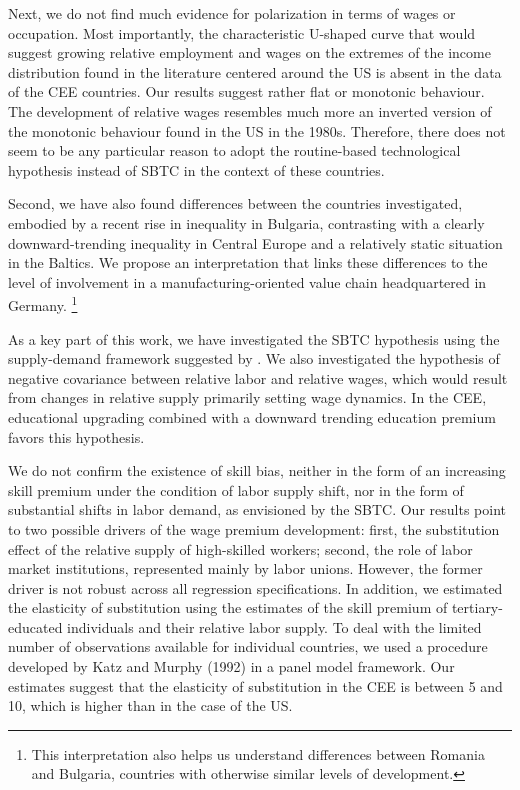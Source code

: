 \documentclass[11pt]{article}
\begin{document}
Next, we do not find much evidence for polarization in terms of wages or occupation. Most importantly, the characteristic U-shaped curve that would suggest growing relative employment and wages on the extremes of the income distribution found in the literature centered around the US is absent in the data of the CEE countries. Our results suggest rather flat or monotonic behaviour. The development of relative wages resembles much more an inverted version of the monotonic behaviour found in the US in the 1980s. Therefore, there does not seem to be any particular reason to adopt the routine-based technological hypothesis instead of SBTC in the context of these countries.

Second, we have also found differences between the countries investigated, embodied by a recent rise in inequality in Bulgaria, contrasting with a clearly downward-trending inequality in Central Europe and a relatively static situation in the Baltics. We propose an interpretation that links these differences to the level of involvement in a manufacturing-oriented value chain headquartered in Germany. \footnote{
This interpretation also helps us understand differences between Romania and Bulgaria, countries with otherwise similar levels of development.}

As a key part of this work, we have investigated the SBTC hypothesis using the supply-demand framework suggested by \citeauthor{katz1992changes}. We also investigated the hypothesis of negative covariance between relative labor and relative wages, which would result from changes in relative supply primarily setting wage dynamics. In the CEE, educational upgrading combined with a downward trending education premium favors this hypothesis.

We do not confirm the existence of skill bias, neither in the form of an increasing skill premium under the condition of labor supply shift, nor in the form of substantial shifts in labor demand, as envisioned by the SBTC. Our results point to two possible drivers of the wage premium development: first, the substitution effect of the relative supply of high-skilled workers; second, the role of labor market institutions, represented mainly by labor unions. However, the former driver is not robust across all regression specifications. In addition, we estimated the elasticity of substitution using the estimates of the skill premium of tertiary-educated individuals and their relative labor supply. To deal with the limited number of observations available for individual countries, we used a procedure developed by Katz and Murphy (1992) in a panel model framework. Our estimates suggest that the elasticity of substitution in the CEE is between 5 and 10, which is higher than in the case of the US.
\end{document}
